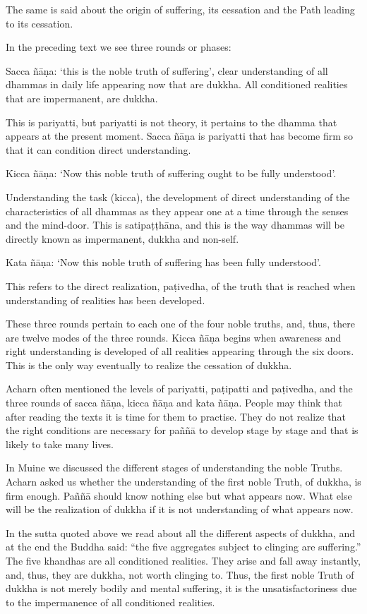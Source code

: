 The same is said about the origin of suffering, its cessation and the
Path leading to its cessation.

In the preceding text we see three rounds or phases:

Sacca ñāṇa: `this is the noble truth of suffering', clear understanding
of all dhammas in daily life appearing now that are dukkha. All
conditioned realities that are impermanent, are dukkha.

This is pariyatti, but pariyatti is not theory, it pertains to the
dhamma that appears at the present moment. Sacca ñāṇa is pariyatti that
has become firm so that it can condition direct understanding.

Kicca ñāṇa: `Now this noble truth of suffering ought to be fully
understood'.

Understanding the task (kicca), the development of direct understanding
of the characteristics of all dhammas as they appear one at a time
through the senses and the mind-door. This is satipaṭṭhāna, and this is
the way dhammas will be directly known as impermanent, dukkha and
non-self.

Kata ñāṇa: `Now this noble truth of suffering has been fully
understood'.

This refers to the direct realization, paṭivedha, of the truth that is
reached when understanding of realities has been developed.

These three rounds pertain to each one of the four noble truths, and,
thus, there are twelve modes of the three rounds. Kicca ñāṇa begins when
awareness and right understanding is developed of all realities
appearing through the six doors. This is the only way eventually to
realize the cessation of dukkha.

Acharn often mentioned the levels of pariyatti, paṭipatti and paṭivedha,
and the three rounds of sacca ñāṇa, kicca ñāṇa and kata ñāṇa. People may
think that after reading the texts it is time for them to practise. They
do not realize that the right conditions are necessary for paññā to
develop stage by stage and that is likely to take many lives.

In Muine we discussed the different stages of understanding the noble
Truths. Acharn asked us whether the understanding of the first noble
Truth, of dukkha, is firm enough. Paññā should know nothing else but
what appears now. What else will be the realization of dukkha if it is
not understanding of what appears now.

In the sutta quoted above we read about all the different aspects of
dukkha, and at the end the Buddha said: ``the five aggregates subject to
clinging are suffering.'' The five khandhas are all conditioned
realities. They arise and fall away instantly, and, thus, they are
dukkha, not worth clinging to. Thus, the first noble Truth of dukkha is
not merely bodily and mental suffering, it is the unsatisfactoriness due
to the impermanence of all conditioned realities.

